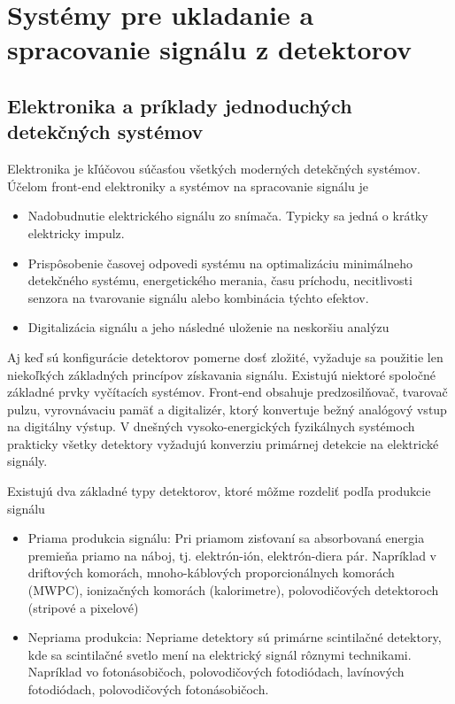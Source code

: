 \documentclass[../../main.tex]{subfiles}
\begin{document}
\chapter{Systémy pre ukladanie a spracovanie signálu z detektorov}
\section{Elektronika a príklady jednoduchých detekčných systémov}
Elektronika je kľúčovou súčasťou všetkých moderných detekčných systémov. Účelom front-end elektroniky a systémov na spracovanie signálu je
\begin{itemize}
\item Nadobudnutie elektrického signálu zo snímača. Typicky sa jedná o krátky elektricky impulz.
\item Prispôsobenie časovej odpovedi systému na optimalizáciu minimálneho detekčného systému, energetického merania, času príchodu, necitlivosti senzora na tvarovanie signálu alebo kombinácia týchto efektov.
\item Digitalizácia signálu a jeho následné uloženie na neskoršiu analýzu
\end{itemize}
Aj keď sú konfigurácie detektorov pomerne dosť zložité, vyžaduje sa použitie len niekoľkých základných princípov získavania signálu. Existujú niektoré spoločné základné prvky vyčítacích systémov. Front-end obsahuje predzosilňovač, tvarovač pulzu, vyrovnávaciu pamäť a digitalizér, ktorý konvertuje bežný analógový vstup na digitálny výstup. V dnešných vysoko-energických fyzikálnych systémoch prakticky všetky detektory vyžadujú konverziu primárnej detekcie na elektrické signály.

Existujú dva základné typy detektorov, ktoré môžme rozdeliť podľa produkcie signálu
\begin{itemize}
\item Priama produkcia signálu: Pri priamom zisťovaní sa absorbovaná energia premieňa priamo na náboj, tj. elektrón-ión, elektrón-diera pár.
Napríklad v driftových komorách, mnoho-káblových proporcionálnych komorách (MWPC), ionizačných komorách (kalorimetre), polovodičových detektoroch (stripové a pixelové)
\item Nepriama produkcia: Nepriame detektory sú primárne scintilačné detektory, kde sa scintilačné svetlo mení na elektrický signál rôznymi technikami. Napríklad vo fotonásobičoch, polovodičových fotodiódach, lavínových fotodiódach, polovodičových fotonásobičoch.
\end{itemize}
\end{document}
